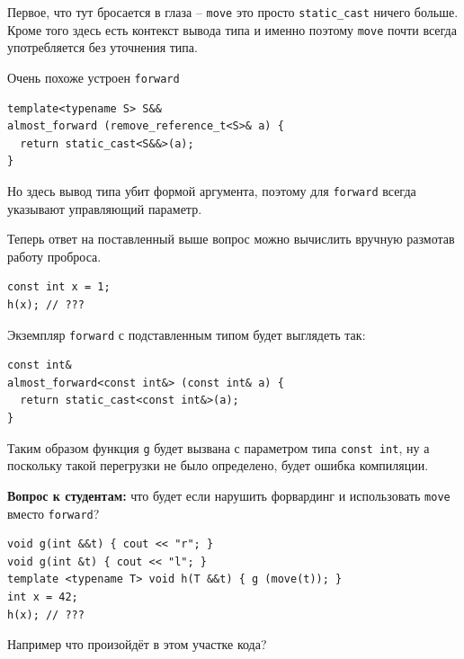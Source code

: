 \documentclass[a4paper,12pt,oneside]{article}
\newif\ifanswers
\begin{document}
Первое, что тут бросается в глаза -- \lstinline!move! это просто \lstinline!static_cast! ничего больше. Кроме того здесь есть контекст вывода типа и именно поэтому \lstinline!move! почти всегда употребляется без уточнения типа.

Очень похоже устроен \lstinline!forward!

\begin{lstlisting}
template<typename S> S&&
almost_forward (remove_reference_t<S>& a) {
  return static_cast<S&&>(a);
}
\end{lstlisting}

Но здесь вывод типа убит формой аргумента, поэтому для \lstinline!forward! всегда указывают управляющий параметр.

Теперь ответ на поставленный выше вопрос можно вычислить вручную размотав работу проброса.

\begin{lstlisting}
const int x = 1;
h(x); // ???
\end{lstlisting}

Экземпляр \lstinline!forward! с подставленным типом будет выглядеть так:

\begin{lstlisting}
const int&
almost_forward<const int&> (const int& a) {
  return static_cast<const int&>(a);
}
\end{lstlisting}

Таким образом функция \lstinline!g! будет вызвана с параметром типа \lstinline!const int!, ну а поскольку такой перегрузки не было определено, будет ошибка компиляции.

\textbf{Вопрос к студентам:} что будет если нарушить форвардинг и использовать \lstinline!move! вместо \lstinline!forward!?

\begin{lstlisting}
void g(int &&t) { cout << "r"; }
void g(int &t) { cout << "l"; }
template <typename T> void h(T &&t) { g (move(t)); } 
int x = 42;
h(x); // ???
\end{lstlisting}

Например что произойдёт в этом участке кода?

\ifanswers
Правильный ответ: после размотки

\begin{lstlisting}
int&& almost_move<int&>(int& a) {
  using rv_ref_t = int&&;
  return static_cast<rv_ref_t>(a);
} 
\end{lstlisting}

Таким образом будет напечатано ``r''
\fi
\end{document}
